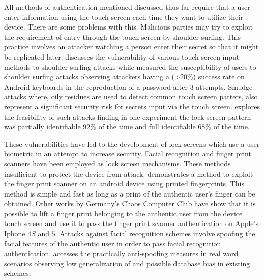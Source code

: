 All methods of authentication mentioned discussed thus far
require that a user enter information using the touch screen
each time they want to utilize their device.
%
There are some problems with this.
Malicious parties may try to 
exploit the requirement of entry through the
touch screen by
shoulder-surfing.
This practice involves an attacker
watching a person enter their secret 
so that it might be replicated later.
%
\cite{hafiz2008towards} discusses the vulnerability of
various touch screen input methods to shoulder-surfing attacks
while
\cite{schaub2012password} measured the susceptibility of 
users to shoulder surfing attacks observing
attackers having a (\textgreater$20\%$) success rate
on Android keyboards
in the reproduction of a password after $3$ attempts.
%
Smudge attacks where,
oily residues are used to detect common touch screen patters,
also represent a significant security risk
for secrets input via the touch screen.
\cite{aviv2010smudge} explores the feasibility of
such attacks finding in one experiment
the lock screen pattern was partially identifiable $92\%$ of the time
and full identifiable $68\%$ of the time.

These vulnerabilities have led to the development of 
lock screens which 
use a user biometric in an attempt to increase security.
Facial recognition and finger print scanners have
been employed as lock screen mechanisms.
These methods insufficient to protect the device from attack.
%
\cite{cao2016hacking} demonstrates a method 
to exploit the finger print scanner on an android device
using printed fingerprints.
This method is simple and fast as long as a print of the
authentic user's finger can be obtained.
%
Other works by Germany's Chaos Computer Club \cite{CHAOS}
have show that it is possible to lift a finger print 
belonging to the authentic user from the device touch screen
and use it to pass the finger print scanner authentication on Apple's Iphone $4S$ and $5$. 
%
Attacks against facial recognition schemes involve
spoofing the facial features of the authentic user
in order to pass facial recognition authentication.
\cite{de2013can}
accesses the practically anti-spoofing measures in real word scenarios
observing 
low generalization of
and possible database bias in existing schemes.

